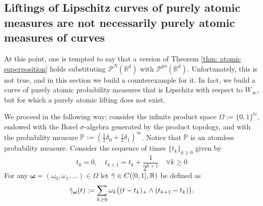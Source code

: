 \documentclass[10pt,leqno]{amsart}
\numberwithin{equation}{section}
\newcommand{\R}{\mathbb{R}}
\newcommand{\PP}{\mathcal{P}}
\newcommand{\PPpa}{\PP^{\operatorname{pa}}}
\newcommand{\PPN}{\PP^N}
\begin{document}
\subsection{Liftings of Lipschitz curves of purely atomic measures are not necessarily purely atomic measures of curves}
At this point, one is tempted to say that a version of Theorem \ref{thm: atomic superposition} holds substituting $\PPN(\R^d)$ with $\PPpa(\R^d)$. Unfortunately, this is not true, and in this section we build a counterexample for it. In fact, we build a curve of purely atomic probability measures that is Lipschitz with respect to $W_\infty$, but for which a purely atomic lifting does not exist.

We proceed in the following way: consider the infinite product space $\Omega := \{0,1\}^\mathbb{N}$, endowed with the Borel $\sigma$-algebra generated by the product topology, and with the probability measure $\mathbb{P}:= (\frac12\delta_0 + \frac12\delta_1)^{\infty}$. Notice that $\mathbb{P}$ is an atomless probability measure. Consider the sequence of times $\{t_k\}_{k\geq 0}$ given by
\[t_0 = 0, \quad t_{k+1} = t_k + \frac{1}{2^{k+1}} \quad \forall k\geq 0\]For any $\boldsymbol{\omega} = (\omega_0,\omega_1,\dots)\in \Omega$ let $\Tilde{\gamma}\in C([0,1],\R)$ be defined as 
\begin{equation}\label{eq:4}
    \Tilde{\gamma}_{\boldsymbol{\omega}}(t):= \sum_{k\geq 0} \omega_k\big( (t-t_k)_+ \wedge (t_{k+1}-t_k) \big).
\end{equation}
\end{document}
